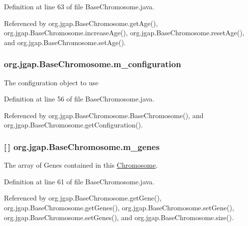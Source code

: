Definition at line 63 of file Base\-Chromosome.\-java.



Referenced by org.\-jgap.\-Base\-Chromosome.\-get\-Age(), org.\-jgap.\-Base\-Chromosome.\-increase\-Age(), org.\-jgap.\-Base\-Chromosome.\-reset\-Age(), and org.\-jgap.\-Base\-Chromosome.\-set\-Age().

\hypertarget{classorg_1_1jgap_1_1_base_chromosome_a2303f591b284ec1ad116c135806af7c3}{
\subsubsection[{m\-\_\-configuration}]{ org.\-jgap.\-Base\-Chromosome.\-m\-\_\-configuration\hspace{0.3cm}{\ttfamily [private]}}}\label{classorg_1_1jgap_1_1_base_chromosome_a2303f591b284ec1ad116c135806af7c3}
The configuration object to use 

Definition at line 56 of file Base\-Chromosome.\-java.



Referenced by org.\-jgap.\-Base\-Chromosome.\-Base\-Chromosome(), and org.\-jgap.\-Base\-Chromosome.\-get\-Configuration().

\hypertarget{classorg_1_1jgap_1_1_base_chromosome_ac1d06474d7d21f73fd602cee8f0d50b4}{
\subsubsection[{m\-\_\-genes}]{ \mbox{[}$\,$\mbox{]} org.\-jgap.\-Base\-Chromosome.\-m\-\_\-genes\hspace{0.3cm}{\ttfamily [private]}}}\label{classorg_1_1jgap_1_1_base_chromosome_ac1d06474d7d21f73fd602cee8f0d50b4}
The array of Genes contained in this \hyperlink{classorg_1_1jgap_1_1_chromosome}{Chromosome}. 

Definition at line 61 of file Base\-Chromosome.\-java.



Referenced by org.\-jgap.\-Base\-Chromosome.\-get\-Gene(), org.\-jgap.\-Base\-Chromosome.\-get\-Genes(), org.\-jgap.\-Base\-Chromosome.\-set\-Gene(), org.\-jgap.\-Base\-Chromosome.\-set\-Genes(), and org.\-jgap.\-Base\-Chromosome.\-size().

